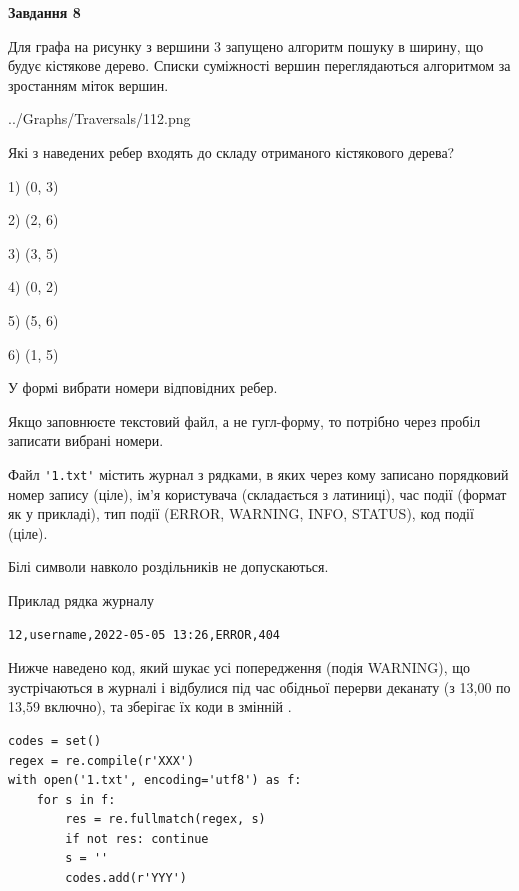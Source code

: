 \documentclass[12pt, ukrainian]{article}
\def\code#1{\Verb!#1!}
\begin{document}
{\begin {large}
{\begin {center}\textbf{Завдання 8}\end {center}}\par
Для графа на рисунку з вершини 3 запущено алгоритм пошуку в ширину, що будує кістякове дерево. Списки суміжності вершин переглядаються алгоритмом за зростанням міток вершин.\par
\begin{center}
	{../Graphs/Traversals/112.png}
\end{center}
\par Які з наведених ребер входять до складу отриманого кістякового дерева?\par
1) (0, 3)\par
2) (2, 6)\par
3) (3, 5)\par
4) (0, 2)\par
5) (5, 6)\par
6) (1, 5)\par
{\vskip 15pt} У формі вибрати номери відповідних ребер.


Якщо заповнюєте текстовий файл, а не гугл-форму, то потрібно через пробіл записа\-ти вибрані номери.\par
\newpage


Файл \code{'1.txt'} містить журнал з рядками, в яких через кому записано поряд\-ко\-вий номер запису (ціле), ім'я користувача (складається з латиниці), час події (фор\-мат як у прикладі), тип події (ERROR, WARNING, INFO, STATUS), код події (ціле).

Білі символи навколо роздільників не допускаються.

Приклад рядка журналу



\begin{verbatim}
12,username,2022-05-05 13:26,ERROR,404
\end{verbatim}


Нижче наведено код, який шукає усі попередження (подія WARNING), що зустрі\-ча\-ються в журналі і відбулися під час обідньої перерви деканату (з 13,00 по 13,59 включно), та зберігає їх коди в змінній .



\begin{verbatim}
codes = set()
regex = re.compile(r'XXX')
with open('1.txt', encoding='utf8') as f:
    for s in f:
        res = re.fullmatch(regex, s)
        if not res: continue
        s = ''
        codes.add(r'YYY')
\end{verbatim}





\end{large}}
\end{document}
